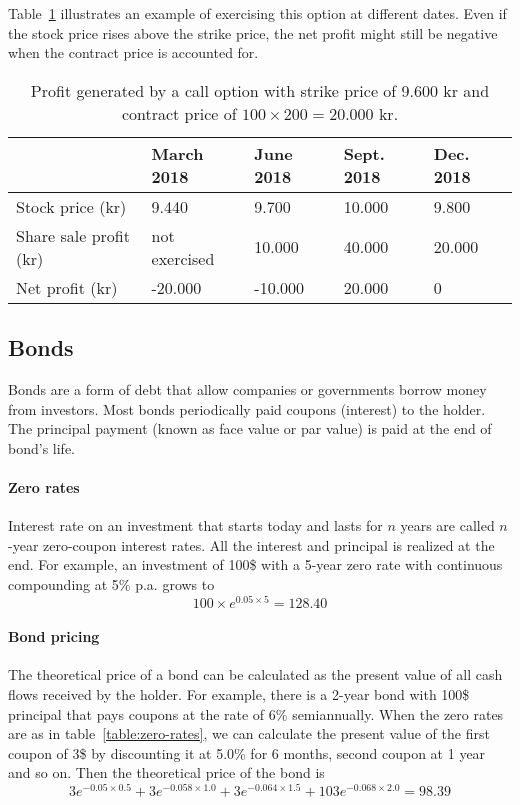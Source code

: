 Table~\ref{table:option-sell} illustrates an example of exercising this option at different dates. Even if the stock price rises above the strike price, the net profit might still be negative when the contract price is accounted for.  

\begin{table}[h]
\centering
\caption{Profit generated by a call option with strike price of 9.600 kr and contract price of $100 \times 200 = 20.000$ kr.}
\label{table:option-sell}
\begin{tabular}{|l|l|l|l|l|}
\hline
                       & March 2018    & June 2018 & Sept. 2018 & Dec. 2018 \\ \hline
Stock price (kr)       & 9.440         & 9.700     & 10.000         & 9.800         \\ \hline
Share sale profit (kr) & not exercised & 10.000    & 40.000         & 20.000        \\ \hline
Net profit (kr)        & -20.000       & -10.000   & 20.000         & 0             \\ \hline
\end{tabular}
\end{table}

\subsection{Bonds}
Bonds are a form of debt that allow companies or governments borrow money from investors. Most bonds periodically paid coupons (interest) to the holder. The principal payment (known as face value or par value) is paid at the end of bond's life.~\cite[pg.80]{ofod}

\paragraph{Zero rates}
Interest rate on an investment that starts today and lasts for $n$ years are called $n$-year zero-coupon interest rates. All the interest and principal is realized at the end. For example, an investment of 100\$ with a 5-year zero rate with continuous compounding at 5\% p.a. grows to~\cite[pg.80]{ofod}
\begin{equation*}
    100 \times e^{0.05 \times 5} = 128.40
\end{equation*}

\paragraph{Bond pricing}
The theoretical price of a bond can be calculated as the present value of all cash flows received by the holder. For example, there is a 2-year bond with 100\$ principal that pays coupons at the rate of 6\% semiannually. When the zero rates are as in table~\ref{table:zero-rates}, we can calculate the present value of the first coupon of 3\$ by discounting it at 5.0\% for 6 months, second coupon at 1 year and so on. Then the theoretical price of the bond is~\cite[pg.80-81]{ofod}
\begin{equation*}
    3e^{-0.05 \times 0.5} + 3e^{-0.058 \times 1.0} + 3e^{-0.064 \times 1.5} + 103e^{-0.068 \times 2.0} = 98.39
\end{equation*}

